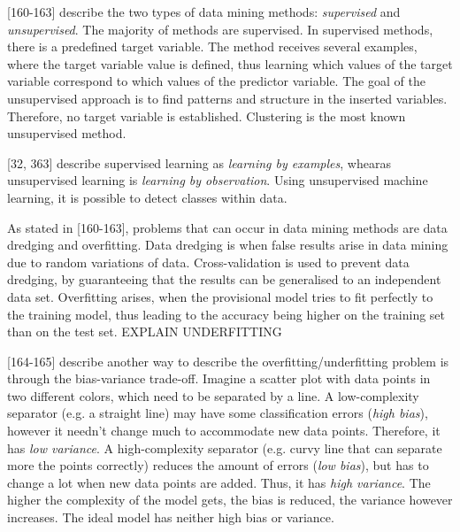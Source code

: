 


\textcite{DataMiningAndPredictiveAnalytics}[160-163] describe the two types of data mining methods: \textit{supervised} and \textit{unsupervised}. The majority of methods are supervised. In supervised methods, there is a predefined target variable. The method receives several examples, where the target variable value is defined, thus learning which values of the target variable correspond to which values of the predictor variable. The goal of the unsupervised approach is to find patterns and structure in the inserted variables. Therefore, no target variable is established. Clustering is the most known unsupervised method.

\textcite{han2011data}[32, 363] describe supervised learning as \textit{learning by examples}, whearas unsupervised learning is \textit{learning by observation}. Using unsupervised machine learning, it is possible to detect classes within data.

As stated in \textcite{DataMiningAndPredictiveAnalytics}[160-163], problems that can occur in data mining methods are data dredging and overfitting. Data dredging is when false results arise in data mining due to random variations of data. Cross-validation is used to prevent data dredging, by guaranteeing that the results can be generalised to an independent data set. %
Overfitting arises, when the provisional model tries to fit perfectly to the training model, thus leading to the accuracy being higher on the training set than on the test set.
EXPLAIN UNDERFITTING

\textcite{DataMiningAndPredictiveAnalytics}[164-165] describe another way to describe the overfitting/underfitting problem is through the bias-variance trade-off. Imagine a scatter plot with data points in two different colors, which need to be separated by a line. A low-complexity separator (e.g. a straight line) may have some classification errors (\textit{high bias}), however it needn't change much to accommodate new data points. Therefore, it has \textit{low variance}. A high-complexity separator (e.g. curvy line that can separate more the points correctly) reduces the amount of errors (\textit{low bias}), but has to change a lot when new data points are added. Thus, it has \textit{high variance}. The higher the complexity of the model gets, the bias is reduced, the variance however increases. The ideal model has neither high bias or variance.









